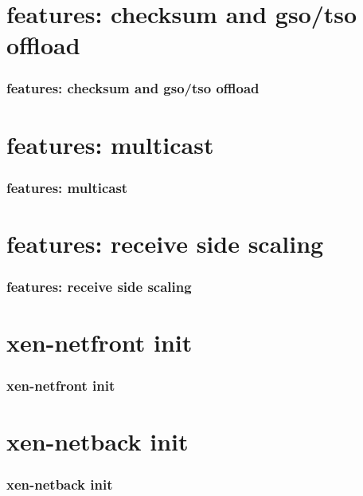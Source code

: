 \documentclass[aspectratio=169]{beamer}
\begin{document}

\section{features: checksum and gso/tso offload}
\begin{frame}
\frametitle{features: checksum and gso/tso offload}
\end{frame}


\section{features: multicast}
\begin{frame}
\frametitle{features: multicast}
\end{frame}


\section{features: receive side scaling}
\begin{frame}
\frametitle{features: receive side scaling}
\end{frame}


\section{xen-netfront init}
\begin{frame}
\frametitle{xen-netfront init}
\end{frame}


\section{xen-netback init}
\begin{frame}
\frametitle{xen-netback init}
\end{frame}


\end{document}
